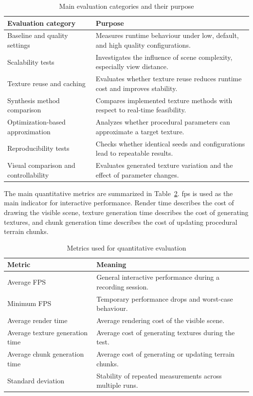 \begin{table}[H]
\centering
\caption{Main evaluation categories and their purpose}
\label{tab:evaluation-categories}
\begin{tabularx}{\textwidth}{|l|X|}
\hline
\textbf{Evaluation category} & \textbf{Purpose} \\
\hline
\hline
Baseline and quality settings & Measures runtime behaviour under low, default, and high quality configurations. \\
\hline
Scalability tests & Investigates the influence of scene complexity, especially view distance. \\
\hline
Texture reuse and caching & Evaluates whether texture reuse reduces runtime cost and improves stability. \\
\hline
Synthesis method comparison & Compares implemented texture methods with respect to real-time feasibility. \\
\hline
Optimization-based approximation & Analyzes whether procedural parameters can approximate a target texture. \\
\hline
Reproducibility tests & Checks whether identical seeds and configurations lead to repeatable results. \\
\hline
Visual comparison and controllability & Evaluates generated texture variation and the effect of parameter changes. \\
\hline
\end{tabularx}
\end{table}

The main quantitative metrics are summarized in Table~\ref{tab:evaluation-metrics}. \gls{fps} is used as the main indicator for interactive performance. Render time describes the cost of drawing the visible scene, texture generation time describes the cost of generating textures, and chunk generation time describes the cost of updating procedural terrain chunks.

\begin{table}[H]
\centering
\caption{Metrics used for quantitative evaluation}
\label{tab:evaluation-metrics}
\begin{tabularx}{\textwidth}{|l|X|}
\hline
\textbf{Metric} & \textbf{Meaning} \\
\hline
\hline
Average FPS & General interactive performance during a recording session. \\
\hline
Minimum FPS & Temporary performance drops and worst-case behaviour. \\
\hline
Average render time & Average rendering cost of the visible scene. \\
\hline
Average texture generation time & Average cost of generating textures during the test. \\
\hline
Average chunk generation time & Average cost of generating or updating terrain chunks. \\
\hline
Standard deviation & Stability of repeated measurements across multiple runs. \\
\hline
\end{tabularx}
\end{table}

